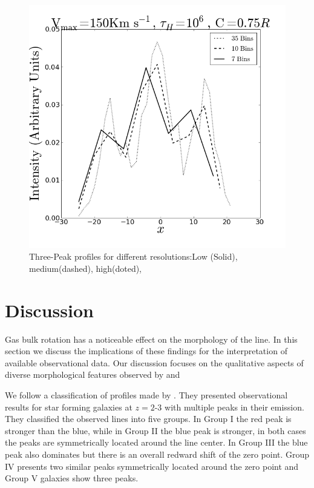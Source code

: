 \documentclass{emulateapj}
\newcommand{\ly}{{\ifmmode{{\rm Ly}\alpha~}\else{Ly$\alpha$~}\fi}}
\begin{document}
\begin{figure}
\includegraphics[scale=0.3]{3p_res.png}
\caption{Three-Peak profiles for different resolutions:Low (Solid), medium(dashed), high(doted), 
   \label{fig:3p_res}} 
\end{figure}


\section{Discussion}
\label{sec:discussion}

Gas bulk rotation has a noticeable effect on the morphology of the
 \ly line. In this section we discuss the implications of these
 findings for the interpretation of available observational data. Our
 discussion focuses on the qualitative aspects of diverse
 morphological features observed by \cite{Kulas12} and \cite{Yamada2012}


We follow a classification of \ly profiles made by
\cite{Kulas12}. They presented observational results for star forming
galaxies at $z=2$-$3$ with multiple peaks in their \ly emission.
They classified the observed lines into five groups. In Group I the
red peak is stronger than the blue, while in Group II the blue peak is
stronger, in both cases the peaks are symmetrically located around the
line center. In Group III the blue peak also dominates but there is an
overall redward shift of the zero point. Group IV presents two similar
peaks symmetrically located around the zero point and Group V galaxies show
three peaks. 
\end{document}
